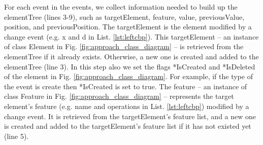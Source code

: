 \documentclass{jot}
\begin{document}
For each \textsf{event} in the \textsf{events}, we collect information needed to build up the \textsf{elementTree}  (lines 3-9), such as \textsf{targetElement}, \textsf{feature}, \textsf{value}, \textsf{previousValue}, \textsf{position}, and \textsf{previousPosition}. The \textsf{targetElement} is the element modified by a change event (e.g. \textsf{x} and \textsf{d} in List. \ref{lst:leftcbp}). This \textsf{targetElement} -- an instance of class Element in Fig. \ref{fig:approach_class_diagram} -- is retrieved from the \textsf{elementTree} if it already exists. Otherwise, a new one is created and added to the \textsf{elementTree} (line 3). In this step also we set the flags \textsf{*IsCreated} and \textsf{*IsDeleted} of the element in Fig. \ref{fig:approach_class_diagram}. For example, if the type of the event is \textsf{create} then \textsf{*IsCreated} is set to \textsf{true}. The \textsf{feature} -- an instance of class Feature in Fig. \ref{fig:approach_class_diagram} -- represents the target element's feature (e.g. \textsf{name} and \textsf{operations} in List. \ref{lst:leftcbp}) modified by a change event. It is  retrieved from the \textsf{targetElement}'s feature list, and a new one is created and added to the \textsf{targetElement}'s feature list if it has not existed yet (line 5). 
\end{document}

